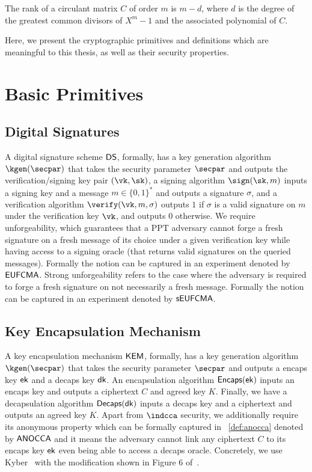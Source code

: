 \begin{lemma}
\label{lem:rank-circulant}
The rank of a circulant matrix $C$ of order $m$ is $m - d$,
where $d$ is the degree of the greatest common divisors of $X^m-1$ and the associated polynomial of $C$.
\end{lemma}

Here, we present the cryptographic primitives and definitions which are meaningful to this thesis, as well as their security properties.

\section{Basic Primitives}
\subsection{Digital Signatures}  
A digital signature scheme $\mathsf{DS}$, formally, 
has a key generation algorithm $\kgen(\secpar)$ 
that takes the security parameter $\secpar$ and outputs the verification/signing key pair $(\vk,\sk)$,  
a signing algorithm $\sign(\sk,m)$ 
inputs a signing key and a message $m \in \{ 0,1\}^*$ and outputs a 
signature $\sigma$, and a verification algorithm 
$\verify(\vk,m,\sigma)$ outputs $1$ if $\sigma$ is a valid signature
on $m$ under the verification key $\vk$, and outputs $0$ otherwise. 
We require unforgeability, which guarantees that a PPT adversary cannot forge a fresh signature on a fresh message of its choice under a given verification key while having access to a signing oracle (that returns valid signatures on the queried messages). Formally the notion can be captured in an experiment denoted by $\mathsf{EUFCMA}$.
Strong unforgeability refers to the case where the adversary is required to forge a fresh signature on not necessarily a fresh message. Formally the notion can be captured in an experiment denoted by $\mathsf{sEUFCMA}$.

\subsection{Key Encapsulation Mechanism} 
A key encapsulation mechanism $\mathsf{KEM}$, formally, has a key generation algorithm $\kgen(\secpar)$ that takes the security parameter $\secpar$ and outputs a encaps key $\mathsf{ek}$ and a decaps key $\mathsf{dk}$. An encapsulation algorithm $\mathsf{Encaps}(\mathsf{ek})$ inputs an encaps key and outputs a ciphertext $C$ and agreed key $K$. Finally, we have a decapsulation algorithm $\mathsf{Decaps}(\mathsf{dk})$ inputs a decaps key and a ciphertext and outputs an agreed key $K$. Apart from $\indcca$ security, we additionally require its anonymous property which can be formally captured in ~\cref{def:anocca} denoted by $\mathsf{ANOCCA}$ and it means the adversary cannot link any ciphertext $C$ to its encaps key $
\mathsf{ek}$ even being able to access a decaps oracle. Concretely, we use Kyber~\cite{NISTPQC-R3:CRYSTALS-KYBER20} with the modification shown in Figure 6 of~\cite{EC:GruMarPat22}.

